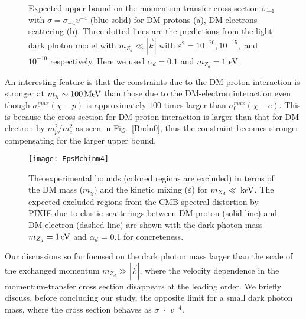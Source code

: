 \documentclass[5p,times]{elsarticle}
\newcommand\mev{\,{\rm MeV}}
\newcommand\kev{\,{\rm keV}}
\newcommand\ev{\,{\rm eV}}
\begin{document}

\begin{figure}[t!]
\centering
{}
\caption{Expected upper bound on the momentum-transfer cross section $\sigma_{-4}$ with $\sigma = \sigma_{-4} v^{-4}$ (blue solid) for DM-protons (a), DM-electrons scattering (b).  Three dotted lines are the predictions from the light dark photon model with $m_{Z_d}\ll |\vec{k}|$ with $\varepsilon^2=10^{-20}, 10^{-15},$ and $10^{-10}$ respectively. Here we used $\alpha_d=0.1$ and  $m_{Z_d}=1$ eV. 
\label{fig:Bndnm4Pro}
}
\end{figure}



{An interesting feature is that the constraints due to the DM-proton interaction is stronger at $m_\chi \sim 100\mev$ than those due to the DM-electron interaction even though $\sigma_0^{max}(\chi-p)$ is approximately $100$ times larger than $\sigma_0^{max}(\chi-e)$.
This is because the cross section for DM-proton interaction is larger than that for DM-electron by $m_p^2/m_e^2$ as seen in Fig.~\ref{Bndn0}, thus the constraint becomes stronger compensating for the larger upper bound. 


\begin{figure}[t!]
\centering
\texttt{[image: EpsMchinm4]}
\caption{The experimental bounds (colored regions are excluded) in terms of the DM mass ($m_\chi$) and the kinetic mixing ($\varepsilon$) for $m_{Z_d}\ll \kev$. The expected excluded regions from the CMB spectral distortion by PIXIE due to elastic scatterings between DM-proton (solid line) and DM-electron (dashed line) are shown with the dark photon mass $m_{Z_d}= 1\ev$ and $\alpha_d$ = 0.1 for concreteness.\label{EpsMchinm4}}
\end{figure}



Our discussions so far focused on the dark photon mass larger than the scale of the exchanged momentum $m_{Z_d}\gg |\vec{k}| $, where the velocity dependence in the momentum-transfer cross section disappears at the leading order. We briefly discuss, before concluding our study, the opposite limit for a small dark photon mass, where the cross section behaves as $\sigma \sim v^{-4}$. 

}
\end{document}
